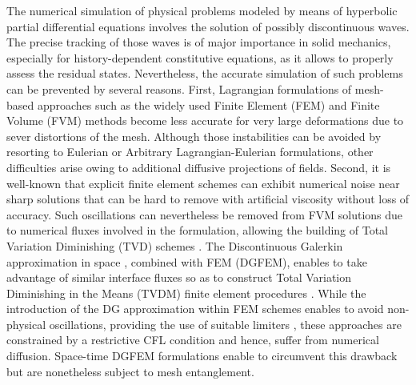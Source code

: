 The numerical simulation of physical problems modeled by means of hyperbolic partial differential equations involves the solution of possibly discontinuous waves.
%
The precise tracking of those waves is of major importance in solid mechanics, especially for history-dependent constitutive equations, as it allows to properly assess the residual states.
%
Nevertheless, the accurate simulation of such problems can be prevented by several reasons.
First, Lagrangian formulations of mesh-based approaches such as the widely used Finite Element (FEM) \cite{Belytschko} and Finite Volume (FVM) \cite{Leveque} methods become less accurate for very large deformations due to sever distortions of the mesh.
Although those instabilities can be avoided by resorting to Eulerian or Arbitrary Lagrangian-Eulerian formulations, other difficulties arise owing to additional diffusive projections of fields.
Second, it is well-known that explicit finite element schemes can exhibit numerical noise near sharp solutions that can be hard to remove with artificial viscosity without loss of accuracy.
Such oscillations can nevertheless be removed from FVM solutions due to numerical fluxes involved in the formulation, allowing the building of Total Variation Diminishing (TVD) schemes \cite{Harten}.
The Discontinuous Galerkin approximation in space \cite{NeutronDG}, combined with FEM (DGFEM), enables to take advantage of similar interface fluxes so as to construct Total Variation Diminishing in the Means (TVDM) finite element procedures \cite{Cockburn}.
While the introduction of the DG approximation within FEM schemes enables to avoid non-physical oscillations, providing the use of suitable limiters \cite{vanLeer_Limiters}, these approaches are constrained by a restrictive CFL condition \cite{DGFEM_CFL} and hence, suffer from numerical diffusion.
Space-time DGFEM formulations \cite{ST_DGFEM1} enable to circumvent this drawback but are nonetheless subject to mesh entanglement.


